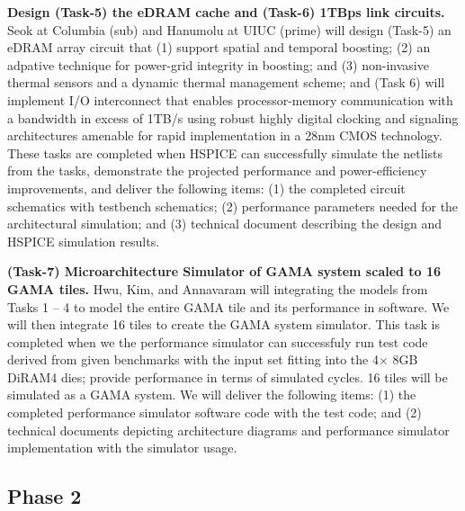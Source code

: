 \vspace{3pt}
\noindent
\textbf{Design (Task-5) the eDRAM cache and (Task-6) 1TBps link circuits.}
Seok at Columbia (sub) and Hanumolu at UIUC (prime) will design 
(Task-5) an eDRAM array circuit that (1) support spatial and temporal boosting; (2) an adpative technique for power-grid integrity in boosting; and (3) non-invasive thermal sensors and a dynamic thermal management scheme; and 
(Task 6) will implement I/O interconnect that enables processor-memory communication with a bandwidth in excess of 1TB/s using robust highly digital clocking and signaling architectures amenable for rapid implementation in a 28nm CMOS technology.
These tasks are completed when HSPICE can successfully simulate the netlists from the tasks, demonstrate the projected performance and power-efficiency improvements, and deliver the following items:
(1) the completed circuit schematics with testbench schematics; (2) performance parameters needed for the architectural simulation; and (3) technical document describing the design and HSPICE simulation results.


\vspace{3pt}
\noindent
\textbf{(Task-7) Microarchitecture Simulator of GAMA system scaled to 16 GAMA tiles.}
Hwu, Kim, and Annavaram will integrating the models from Tasks 1 -- 4 to model the entire GAMA tile and its performance in software. We will then integrate 16 tiles to create the GAMA system simulator. 
This task is completed when we the performance simulator can successfuly run test code derived from given benchmarks with the input set fitting into the 4$\times$ 8GB DiRAM4 dies; provide performance in terms of simulated cycles. 16 tiles will be simulated as a GAMA system. We will deliver the following items:
(1) the completed performance simulator software code with the test code; and (2) technical documents depicting architecture diagrams and performance simulator implementation with the simulator usage.


\subsection{Phase 2}
%

